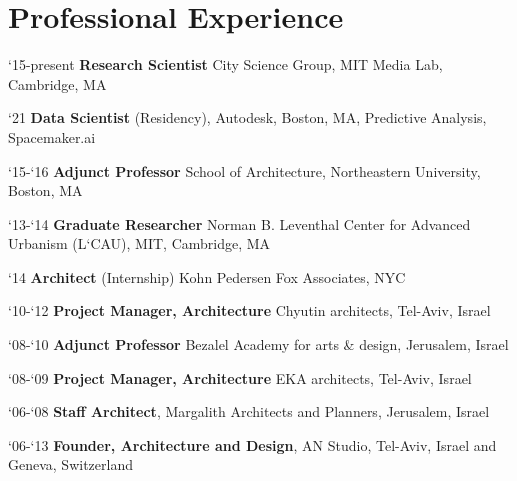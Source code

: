 \section*{Professional Experience}

\begin{tablist}
   \item[`15-present]\tab\textbf{Research Scientist}
   City Science Group, MIT Media Lab, Cambridge, MA

   \item[`21]\tab\textbf{Data Scientist} (Residency),
   Autodesk, Boston, MA, Predictive Analysis, Spacemaker.ai

   \item[`15-`16]\tab\textbf{Adjunct Professor}
   School of Architecture, Northeastern University, Boston, MA

   \item[`13-`14]\tab\textbf{Graduate Researcher}
   Norman B. Leventhal Center for Advanced Urbanism (L`CAU), MIT, Cambridge, MA

   \item[`14]\tab\textbf{Architect} (Internship)
   Kohn Pedersen Fox Associates, NYC

   \item[`10-`12]\tab
   \textbf{Project Manager, Architecture} Chyutin architects, Tel-Aviv, Israel

   \item[`08-`10]\tab\textbf{Adjunct Professor}
   Bezalel Academy for arts \& design, Jerusalem, Israel

   \item[`08-`09]\tab\textbf{Project Manager, Architecture}
   EKA architects, Tel-Aviv, Israel

   \item[`06-`08]\tab\textbf{Staff Architect},
   Margalith Architects and Planners, Jerusalem, Israel

   \item[`06-`13]\tab
   \textbf{Founder, Architecture and Design},
   AN Studio, Tel-Aviv, Israel and Geneva, Switzerland
\end{tablist}
